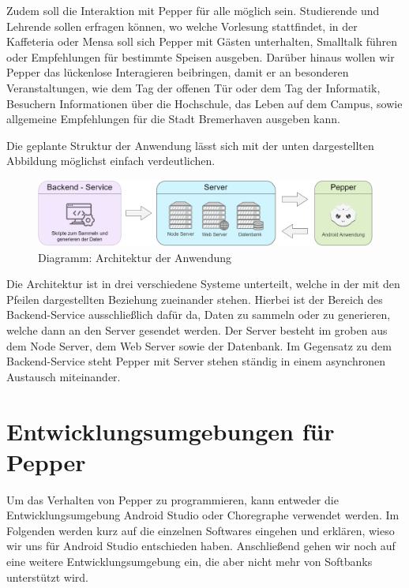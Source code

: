 Zudem soll die Interaktion mit Pepper für alle möglich sein. Studierende und Lehrende sollen erfragen können,
wo welche Vorlesung stattfindet, in der Kaffeteria oder Mensa soll sich Pepper mit Gästen unterhalten, Smalltalk führen oder
Empfehlungen für bestimmte Speisen ausgeben. Darüber hinaus wollen wir Pepper das lückenlose Interagieren beibringen, damit er an
besonderen Veranstaltungen, wie dem Tag der offenen Tür oder dem Tag der Informatik, Besuchern Informationen über die Hochschule,
das Leben auf dem Campus, sowie allgemeine Empfehlungen für die Stadt Bremerhaven ausgeben kann.

Die geplante Struktur der Anwendung lässt sich mit der unten dargestellten Abbildung möglichst einfach verdeutlichen.\\

\begin{figure}[H]
    \includegraphics[width=\textwidth]{Figures/anwendungarchitektur.png}
    \caption{Diagramm: Architektur der Anwendung}
    \label{fig:integration}
    \centering
\end{figure}

Die Architektur ist in drei verschiedene Systeme unterteilt, welche in der mit den Pfeilen dargestellten Beziehung zueinander stehen. Hierbei ist der Bereich des Backend-Service ausschließlich dafür da, Daten zu sammeln oder zu generieren, welche dann an den Server gesendet werden. Der Server besteht im groben aus dem Node Server, dem Web Server sowie der Datenbank. Im Gegensatz zu dem Backend-Service steht Pepper mit Server stehen ständig in einem asynchronen Austausch miteinander.\\

\section{Entwicklungsumgebungen für Pepper}

Um das Verhalten von Pepper zu programmieren, kann entweder die Entwicklungsumgebung Android Studio oder Choregraphe verwendet werden. Im Folgenden werden kurz auf die einzelnen Softwares eingehen und erklären, wieso wir uns für Android Studio entschieden haben. Anschließend gehen wir noch auf eine weitere Entwicklungsumgebung ein, die aber nicht mehr von Softbanks unterstützt wird.\\

